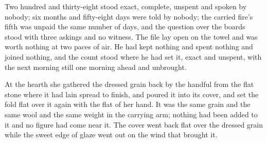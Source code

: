 Two hundred and thirty-eight stood exact, complete, unspent and spoken by nobody; six months and fifty-eight days were told by nobody; the carried fire's fifth was unpaid the same number of days, and the question over the boards stood with three askings and no witness. The file lay open on the towel and was worth nothing at two paces of air. He had kept nothing and spent nothing and joined nothing, and the count stood where he had set it, exact and unspent, with the next morning still one morning ahead and unbrought.

At the hearth she gathered the dressed grain back by the handful from the flat stone where it had lain spread to finish, and poured it into its cover, and set the fold flat over it again with the flat of her hand. It was the same grain and the same wool and the same weight in the carrying arm; nothing had been added to it and no figure had come near it. The cover went back flat over the dressed grain while the sweet edge of glaze went out on the wind that brought it.
